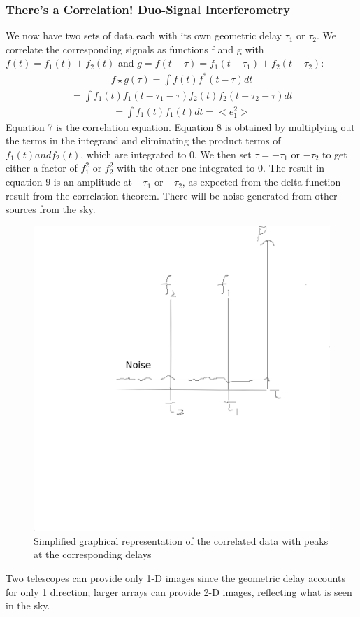 \documentclass{article}
\begin{document}
\subsubsection{There's a Correlation! Duo-Signal Interferometry}
We now have two sets of data each with its own geometric delay
$\tau_{1}$ or $\tau_{2}$. We correlate the corresponding signals as
functions f and g with $f(t) = f_{1}(t) + f_{2}(t)$ and $g = f(t-\tau) =
f_{1}(t-\tau_{1}) + f_{2}(t-\tau_{2})$:
\begin{align}f\star{g}(\tau) = \int{f(t)f^{\ast}(t-\tau)dt} 
\end{align}
\begin{align}=
  \int{f_{1}(t)f_{1}(t-\tau_{1}-\tau)f_{2}(t)f_{2}(t-\tau_{2}-\tau)dt}
\end{align}
\begin{align}= \int{f_{1}(t)f_{1}(t)dt} = <e_{1}^{2}>
\end{align}
Equation 7 is the correlation equation. Equation 8 is obtained by
multiplying out the terms in the integrand and eliminating the product 
terms of $f_{1}(t) and f_{2}(t)$, which are integrated to 0. We then set 
$\tau = -\tau_{1}$ or $-\tau_{2}$ to get either a factor of $f_{1}^{2}$
or $f_{2}^{2}$ with the other one integrated to 0. The result in
equation 9 is an amplitude at $-\tau_{1}$ or $-\tau_{2}$, as expected
from the delta function result from the correlation theorem. There will 
be noise generated from other sources from the sky.
\begin{figure}[!h]
\centering
\includegraphics[width=.55\textwidth]{delay.png}
\caption{Simplified graphical representation of the correlated data with peaks at
  the corresponding delays}
\end{figure}
Two telescopes can provide only 1-D images since the geometric delay
accounts for only 1 direction; larger arrays can provide 2-D images,
reflecting what is seen in the sky.
\end{document}
